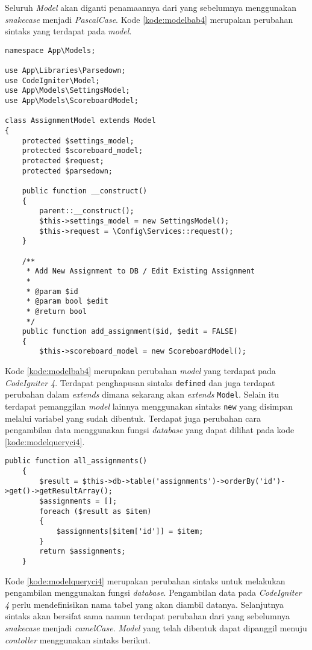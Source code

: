Seluruh \textit{Model} akan diganti penamaannya dari yang sebelumnya menggunakan \textit{snakecase} menjadi \textit{PascalCase}. Kode \ref{kode:modelbab4} merupakan perubahan sintaks yang terdapat pada \textit{model}.

\begin{lstlisting}[caption=Perancangan perubahan \textit{model} pada \textit{CodeIgniter 4}, label=kode:modelbab4]
namespace App\Models;

use App\Libraries\Parsedown;
use CodeIgniter\Model;
use App\Models\SettingsModel;
use App\Models\ScoreboardModel;

class AssignmentModel extends Model
{
	protected $settings_model;
	protected $scoreboard_model;
	protected $request;
	protected $parsedown;

	public function __construct()
	{
		parent::__construct();
		$this->settings_model = new SettingsModel();
		$this->request = \Config\Services::request(); 
	}

	/**
	 * Add New Assignment to DB / Edit Existing Assignment
	 *
	 * @param $id
	 * @param bool $edit
	 * @return bool
	 */
	public function add_assignment($id, $edit = FALSE)
	{	
		$this->scoreboard_model = new ScoreboardModel();
\end{lstlisting}

Kode \ref{kode:modelbab4} merupakan perubahan \textit{model} yang terdapat pada \textit{CodeIgniter 4}. Terdapat penghapusan sintaks \texttt{defined} dan juga terdapat perubahan dalam \textit{extends} dimana sekarang akan \textit{extends} \texttt{Model}. Selain itu terdapat pemanggilan \textit{model} lainnya menggunakan sintaks \texttt{new} yang disimpan melalui variabel yang sudah dibentuk. Terdapat juga perubahan cara pengambilan data menggunakan fungsi \textit{database} yang dapat dilihat pada kode \ref{kode:modelqueryci4}.

\begin{lstlisting}[caption=Perubahan sintaks pada \textit{model}, label=kode:modelqueryci4]
	public function all_assignments()
	{
		$result = $this->db->table('assignments')->orderBy('id')->get()->getResultArray();
		$assignments = [];
		foreach ($result as $item)
		{
			$assignments[$item['id']] = $item;
		}
		return $assignments;
	}
\end{lstlisting}

Kode \ref{kode:modelqueryci4} merupakan perubahan sintaks untuk melakukan pengambilan menggunakan fungsi \textit{database}. Pengambilan data pada \textit{CodeIgniter 4} perlu mendefinisikan nama tabel yang akan diambil datanya. Selanjutnya sintaks akan bersifat sama namun terdapat perubahan dari yang sebelumnya \textit{snakecase} menjadi \textit{camelCase}. \textit{Model} yang telah dibentuk dapat dipanggil menuju \textit{contoller} menggunakan sintaks berikut.

